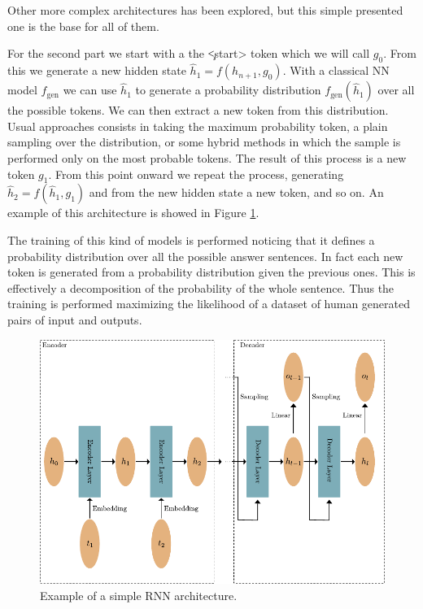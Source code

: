 \documentclass[]{marticle}
\begin{document}
Other more complex architectures has been explored, but this simple presented one is the base for
all of them.

For the second part we start with a the \c{<start>} token which we will call $g_0$. From this we
generate a new hidden state $\hat{h}_1 = f(h_{n+1}, g_0)$. With a classical NN model $f_\text{gen}$ we can
use $\hat{h}_1$ to generate a probability distribution $f_\text{gen} (\hat{h}_1)$ over all the possible
tokens. We can then extract a new token from this distribution. Usual approaches consists in taking
the maximum probability token, a plain sampling over the distribution, or some hybrid methods in
which the sample is performed only on the most probable tokens. The result of this process is a new
token $g_1$. From this point onward we repeat the process, generating $\hat{h}_2 = f(\hat{h}_1, g_1)$
and from the new hidden state a new token, and so on. An example of this architecture is showed in
Figure \ref{fig:recurrent-arch-1}.

The training of this kind of models is performed noticing that it defines a probability distribution
over all the possible answer sentences. In fact each new token is generated from a probability
distribution given the previous ones. This is effectively a decomposition of the probability of the
whole sentence. Thus the training is performed maximizing the likelihood of a dataset of human
generated pairs of input and outputs.

\begin{figure}[!tb] 
\begin{center}
\includegraphics{recurrent_simple.pdf}
\caption{Example of a simple RNN architecture.} 
\label{fig:recurrent-arch-1} 
\end{center}
\end{figure}
\end{document}
